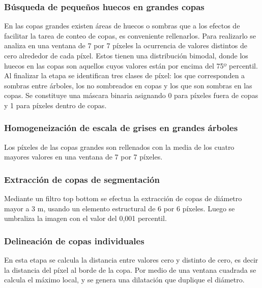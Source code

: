 \subsubsection{Búsqueda de pequeños huecos en grandes copas}
En las copas grandes existen áreas de huecos o sombras que a los efectos de facilitar la tarea de conteo de copas, es conveniente rellenarlos. Para realizarlo se analiza en una ventana de 7 por 7 píxeles la ocurrencia de valores distintos de cero alrededor de cada píxel. Estos tienen una distribución bimodal, donde los huecos en las copas son aquellos cuyos valores están por encima del 75º percentil. Al finalizar la etapa se identifican tres clases de píxel: los que corresponden a sombras entre árboles, los no sombreados en copas y los que son sombras en las copas. Se constituye una máscara binaria asignando 0 para píxeles fuera de copas y 1 para píxeles dentro de copas.
\subsubsection{Homogeneización de escala de grises en grandes árboles}
Los píxeles de las copas grandes son rellenados con la media de los cuatro mayores valores en una ventana de 7 por 7 píxeles.
\subsubsection{Extracción de copas de segmentación}
Mediante un filtro top bottom se efectua la extracción de copas de diámetro mayor a 3 m, usando un elemento estructural de 6 por 6 píxeles. Luego se umbraliza la imagen con el valor del 0,001 percentil.
\subsubsection{Delineación de copas individuales}
En esta etapa se calcula la distancia entre valores cero y distinto de cero, es decir la distancia del píxel al borde de la copa. Por medio de una ventana cuadrada se calcula el máximo local, y se genera una dilatación que duplique el diámetro.
